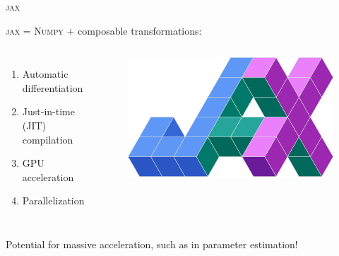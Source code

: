 \documentclass[usenames,dvipsnames,t]{beamer}
\begin{document}
\begin{frame}{\textsc{jax}}

\def\x{4mm}



\textsc{jax} = \textsc{Numpy} $+$ composable transformations: 
\begin{columns}
  \begin{enumerate}
    \item Automatic differentiation
    
    \vspace{\x}
    
    \item Just-in-time (JIT) compilation
    
    \vspace{\x}
    
    \item GPU acceleration
    
    \vspace{\x}
    
    \item Parallelization
    
    
    
    
  \end{enumerate}
  \begin{figure}
    \includegraphics[width=\textwidth]{Figures/jax.png}
  \end{figure}
\end{columns}

\vspace{1.2cm}

Potential for massive acceleration, such as in parameter estimation!

\end{frame}
\end{document}
